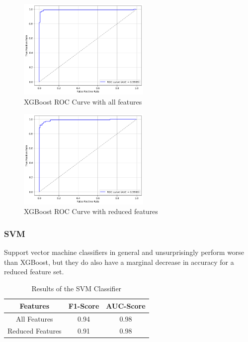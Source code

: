 \documentclass[conference]{IEEEtran}
\begin{document}
\begin{figure}[h]
	\begin{center}
		\includegraphics[width=2.5in]{xg-roc-curve}
		\caption{XGBoost ROC Curve with all features}\label{fig:xg-roc-curve}
	\end{center}
\end{figure}

\begin{figure}[h]
	\begin{center}
		\includegraphics[width=2.5in]{xg-roc-curve-reduced}
		\caption{XGBoost ROC Curve with reduced features}\label{fig:xg-roc-curve-reduced}
	\end{center}
\end{figure}

\subsubsection{SVM}

Support vector machine classifiers in general and unsurprisingly perform worse than XGBoost, but they do also have a marginal decrease in accuracy for a reduced feature set.

\begin{table}[h!]
	\begin{center}
		\begin{tabular}{| c | c c |}
			\hline
			Features         & F1-Score & AUC-Score \\ [0.5ex]
			\hline
			All Features     & 0.94     & 0.98      \\
			Reduced Features & 0.91     & 0.98      \\[1ex]
			\hline
		\end{tabular}
	\end{center}
	\caption{Results of the SVM Classifier}
	\label{table:svm-results}
\end{table}
\end{document}
